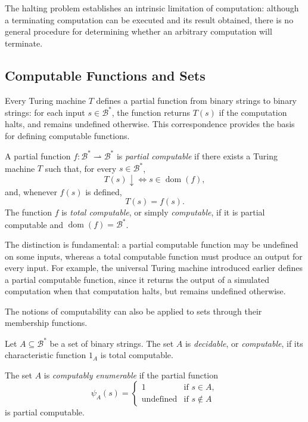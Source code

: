 The halting problem establishes an intrinsic limitation of computation: although a terminating computation can be executed and its result obtained, there is no general procedure for determining whether an arbitrary computation will terminate.


\subsection*{Computable Functions and Sets}

Every Turing machine $T$ defines a partial function from binary strings to binary strings: for each input $s\in\mathcal{B}^\ast$, the function returns $T(s)$ if the computation halts, and remains undefined otherwise. This correspondence provides the basis for defining computable functions.

\begin{definition}
\label{def:computable-function}
A partial function $f:\mathcal{B}^\ast\rightharpoonup\mathcal{B}^\ast$ is \emph{partial computable} if there exists a Turing machine $T$ such that, for every $s\in\mathcal{B}^\ast$,
\[
T(s)\downarrow \iff s\in\operatorname{dom}(f),
\]
and, whenever $f(s)$ is defined,
\[
T(s)=f(s).
\]
The function $f$ is \emph{total computable}, or simply \emph{computable}, if it is partial computable and $\operatorname{dom}(f)=\mathcal{B}^\ast$.
\end{definition}

The distinction is fundamental: a partial computable function may be undefined on some inputs, whereas a total computable function must produce an output for every input. For example, the universal Turing machine introduced earlier defines a partial computable function, since it returns the output of a simulated computation when that computation halts, but remains undefined otherwise.

The notions of computability can also be applied to sets through their membership functions.

\begin{definition}
Let $A\subseteq\mathcal{B}^\ast$ be a set of binary strings. The set $A$ is \emph{decidable}, or \emph{computable}, if its characteristic function $1_A$ is total computable.

The set $A$ is \emph{computably enumerable} if the partial function
\[
\psi_A(s)=
\begin{cases}
1 & \text{if }s\in A,\\
\text{undefined} & \text{if }s\notin A
\end{cases}
\]
is partial computable.
\end{definition}


